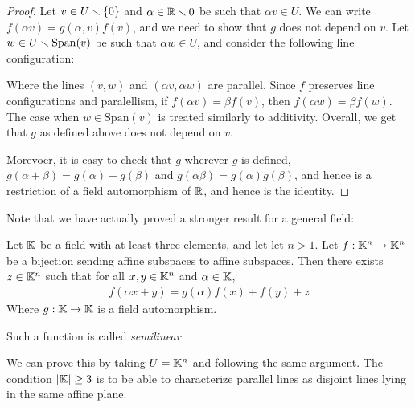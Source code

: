 \begin{proof}
  Let $v\in U\smallsetminus \{0\}$ and $\alpha \in \mathbb{R}\smallsetminus 0$ be such that 
  $\alpha v\in U$. We can write $f(\alpha v) = g(\alpha,v)f(v)$, and
  we need to show that $g$ does not depend on $v$. Let
  $w\in U\smallsetminus \mathrm{Span}(v)$ be such that $\alpha w\in U$, 
  and consider the following line configuration:
  \begin{figure}
    \centering
  \end{figure}
  Where the lines $(v,w)$ and $(\alpha v,\alpha w)$ are parallel. 
  Since $f$ preserves line configurations and paralellism, if 
  $f(\alpha v) = \beta f(v)$, then 
  $f(\alpha w) = \beta f(w)$. The case when 
  $w\in \mathrm{Span}(v)$ is treated similarly to additivity. 
  Overall, we get that $g$ as defined above 
  does not depend on $v$.

  Morevoer, it is easy to check that $g$ wherever 
  $g$ is defined, $g(\alpha+\beta) = g(\alpha) + g(\beta)$ 
  and $g(\alpha\beta) = g(\alpha)g(\beta)$, and hence 
  is a restriction of a field 
  automorphism of $\mathbb{R}$, and hence is the identity.
\end{proof}
Note that we have actually proved a stronger result 
for a general field:
\begin{theorem}
  Let $\mathbb{K}$ be a field with at least three elements, and 
  let let $n>1$. Let $f:\mathbb{K}^n\to \mathbb{K}^n$ be a bijection sending 
  affine subspaces to affine subspaces. Then 
  there exists $z\in \mathbb{K}^n$ such that for all 
  $x,y\in \mathbb{K}^n$ and $\alpha\in \mathbb{K}$,
  \begin{align*}
    f(\alpha x + y) = g(\alpha)f(x) + f(y) + z
  \end{align*}
  Where $g:\mathbb{K}\to\mathbb{K}$ is a field automorphism.

  Such a function is called \textit{semilinear}
\end{theorem}
We can prove this by taking $U = \mathbb{K}^n$ and following the same argument. 
The condition $|\mathbb{K}|\ge 3$ is to be able to characterize 
parallel lines as disjoint lines lying in the same affine plane.

